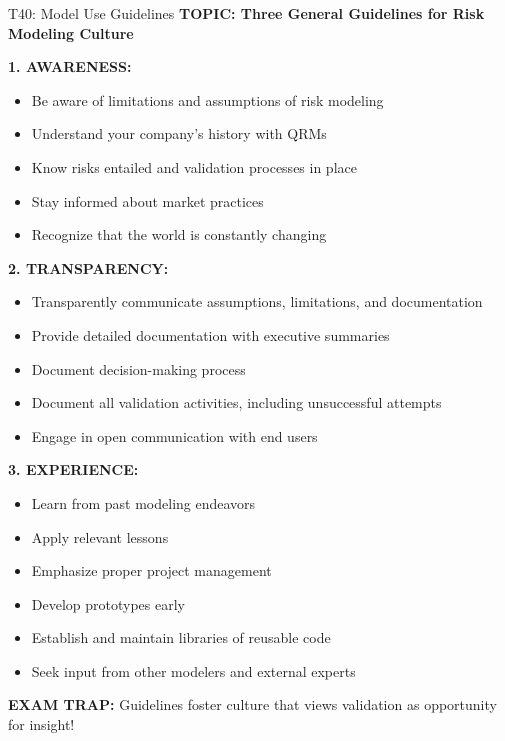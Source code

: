 \documentclass[8pt]{beamer}
\begin{document}
	\begin{frame}{T40: Model Use Guidelines}
		\fontsize{6.5}{7.5}\selectfont
		\textbf{TOPIC: Three General Guidelines for Risk Modeling Culture}
		
		\vspace{0.1cm}
		\textbf{1. AWARENESS:}
		\begin{itemize}
			\item Be aware of limitations and assumptions of risk modeling
			\item Understand your company's history with QRMs
			\item Know risks entailed and validation processes in place
			\item Stay informed about market practices
			\item Recognize that the world is constantly changing
		\end{itemize}
		
		\vspace{0.1cm}
		\textbf{2. TRANSPARENCY:}
		\begin{itemize}
			\item Transparently communicate assumptions, limitations, and documentation
			\item Provide detailed documentation with executive summaries
			\item Document decision-making process
			\item Document all validation activities, including unsuccessful attempts
			\item Engage in open communication with end users
		\end{itemize}
		
		\vspace{0.1cm}
		\textbf{3. EXPERIENCE:}
		\begin{itemize}
			\item Learn from past modeling endeavors
			\item Apply relevant lessons
			\item Emphasize proper project management
			\item Develop prototypes early
			\item Establish and maintain libraries of reusable code
			\item Seek input from other modelers and external experts
		\end{itemize}
		
		\textcolor{myred}{\textbf{EXAM TRAP:}} Guidelines foster \textcolor{myblue}{culture that views validation as opportunity for insight}!
	\end{frame}
	
\end{document}
